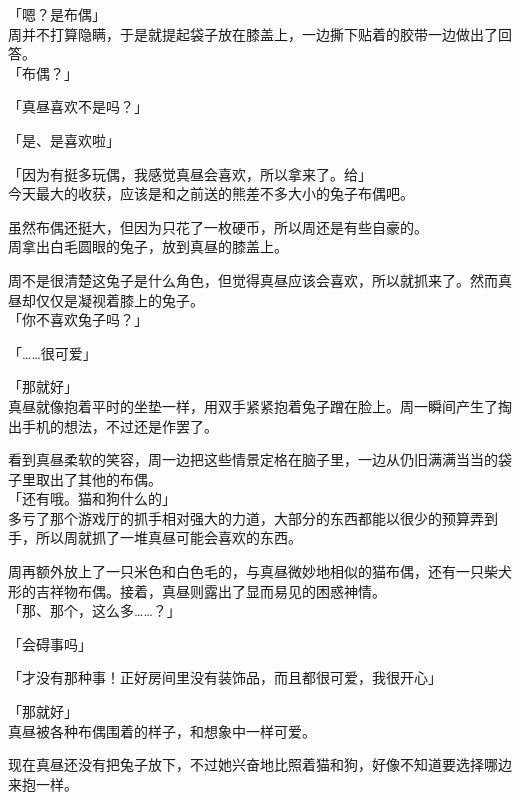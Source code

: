 「嗯？是布偶」\\

周并不打算隐瞒，于是就提起袋子放在膝盖上，一边撕下贴着的胶带一边做出了回答。\\

「布偶？」

「真昼喜欢不是吗？」

「是、是喜欢啦」

「因为有挺多玩偶，我感觉真昼会喜欢，所以拿来了。给」\\

今天最大的收获，应该是和之前送的熊差不多大小的兔子布偶吧。

虽然布偶还挺大，但因为只花了一枚硬币，所以周还是有些自豪的。\\

周拿出白毛圆眼的兔子，放到真昼的膝盖上。

周不是很清楚这兔子是什么角色，但觉得真昼应该会喜欢，所以就抓来了。然而真昼却仅仅是凝视着膝上的兔子。\\

「你不喜欢兔子吗？」

「……很可爱」

「那就好」\\

真昼就像抱着平时的坐垫一样，用双手紧紧抱着兔子蹭在脸上。周一瞬间产生了掏出手机的想法，不过还是作罢了。

看到真昼柔软的笑容，周一边把这些情景定格在脑子里，一边从仍旧满满当当的袋子里取出了其他的布偶。\\

「还有哦。猫和狗什么的」\\

多亏了那个游戏厅的抓手相对强大的力道，大部分的东西都能以很少的预算弄到手，所以周就抓了一堆真昼可能会喜欢的东西。

周再额外放上了一只米色和白色毛的，与真昼微妙地相似的猫布偶，还有一只柴犬形的吉祥物布偶。接着，真昼则露出了显而易见的困惑神情。\\

「那、那个，这么多……？」

「会碍事吗」

「才没有那种事！正好房间里没有装饰品，而且都很可爱，我很开心」

「那就好」\\

真昼被各种布偶围着的样子，和想象中一样可爱。

现在真昼还没有把兔子放下，不过她兴奋地比照着猫和狗，好像不知道要选择哪边来抱一样。\\

